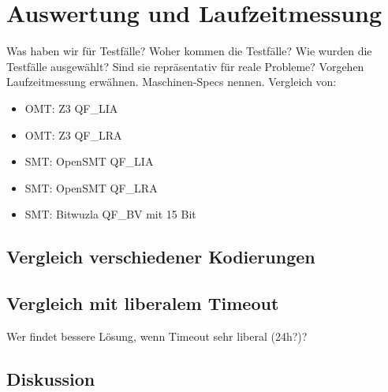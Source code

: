 \chapter{Auswertung und Laufzeitmessung}
\label{chapter:auswertung}

Was haben wir für Testfälle?
Woher kommen die Testfälle?
Wie wurden die Testfälle ausgewählt?
Sind sie repräsentativ für reale Probleme?
Vorgehen Laufzeitmessung erwähnen.
Maschinen-Specs nennen.
Vergleich von:
\begin{itemize}
    \item OMT: Z3 QF\_LIA
    \item OMT: Z3 QF\_LRA
    \item SMT: OpenSMT QF\_LIA
    \item SMT: OpenSMT QF\_LRA
    \item SMT: Bitwuzla QF\_BV mit 15 Bit
\end{itemize}

\section{Vergleich verschiedener Kodierungen}

\section{Vergleich mit liberalem Timeout}
Wer findet bessere Lösung, wenn Timeout sehr liberal (24h?)?

\section{Diskussion}

